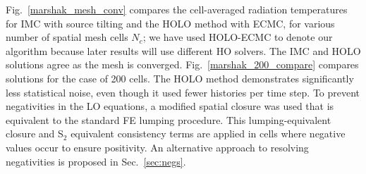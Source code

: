 \documentclass[11pt]{article}
\begin{document}
Fig.~\ref{marshak_mesh_conv} compares the cell-averaged radiation temperatures  for
IMC with source tilting and the HOLO method with ECMC, for various number of spatial mesh cells $N_c$; we
have used HOLO-ECMC to denote our algorithm because later results will use different
HO solvers.  The IMC and HOLO solutions agree as the mesh is converged.  
Fig.~\ref{marshak_200_compare} compares solutions
for the case of 200 cells.  The HOLO method demonstrates significantly less
statistical noise, even though it used fewer histories per time step. To prevent
negativities in the LO equations, a modified spatial closure was used that is equivalent to the
standard FE lumping procedure.  This lumping-equivalent closure and S$_2$ equivalent consistency
terms are applied in cells where negative values occur to ensure positivity.  An alternative approach to resolving negativities is proposed in Sec.~\ref{sec:negs}.
\end{document}

